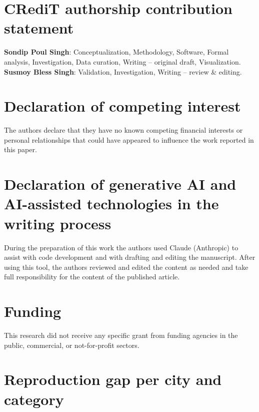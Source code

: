 \documentclass[preprint,12pt,authoryear]{elsarticle}
\begin{document}
\section*{CRediT authorship contribution statement}
\textbf{Sondip Poul Singh}: Conceptualization, Methodology, Software, Formal analysis, Investigation, Data curation, Writing -- original draft, Visualization. \textbf{Susmoy Bless Singh}: Validation, Investigation, Writing -- review \& editing.
\fi

\section*{Declaration of competing interest}
The authors declare that they have no known competing financial interests or personal relationships that could have appeared to influence the work reported in this paper.

\section*{Declaration of generative AI and AI-assisted technologies in the writing process}
During the preparation of this work the authors used Claude (Anthropic) to assist with code development and with drafting and editing the manuscript. After using this tool, the authors reviewed and edited the content as needed and take full responsibility for the content of the published article.

\section*{Funding}
This research did not receive any specific grant from funding agencies in the public, commercial, or not-for-profit sectors.

\FloatBarrier



\appendix
\section{Reproduction gap per city and category}\label{app:repro}

\end{document}
